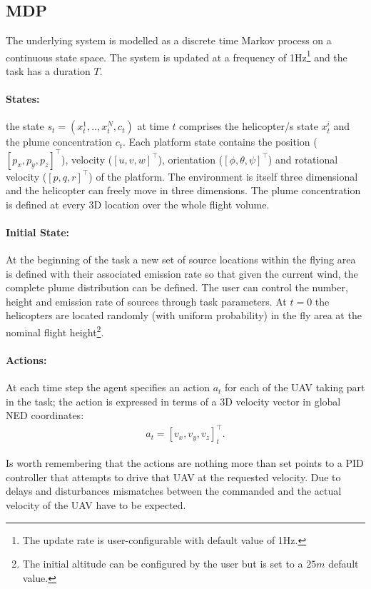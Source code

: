 \documentclass[a4paper,11pt]{report}
\begin{document}
\subsection{MDP}
The underlying system is modelled as a discrete time Markov process on a continuous state space. The system is updated at a frequency of 1Hz\footnote{The update rate is user-configurable with default value of 1Hz.} and the task has a duration $T$.

\paragraph{States:} the state $s_t=(x^1_t,..,x^N_t,c_t)$ at time $t$ comprises the helicopter/s state $x^i_t$ and the plume concentration $c_t$.
Each platform state contains the position ($[p_x,p_y,p_z]^\intercal$), velocity ($[u,v,w]^\intercal$), orientation ($[\phi,\theta,\psi]^\intercal$) and rotational velocity ($[p,q,r]^\intercal$) of the platform. The environment is itself three dimensional and the helicopter can freely move in three dimensions. The plume concentration is defined at every 3D location over the whole flight volume.

\paragraph{Initial State:} At the beginning of the task a new set of source locations within the flying area is defined with their associated emission rate so that given the current wind, the complete plume distribution can be defined. The user can control the number, height and emission rate of sources through task parameters.
At $t=0$ the helicopters are located randomly (with uniform probability) in the fly area at the nominal flight height\footnote{The initial altitude can be configured by the user but is set to a $25m$ default value.}.

\paragraph{Actions:}
At each time step the agent specifies an action $a_t$ for each of the UAV taking part in the task; the action is expressed in terms of a 3D velocity vector in global NED coordinates:
\begin{align}
a_t=[v_x,v_y,v_z]_t^\intercal.
\end{align}

Is worth remembering that the actions are nothing more than set points to a PID controller that attempts to drive that UAV at the requested velocity.
Due to delays and disturbances mismatches between the commanded and the actual velocity of the UAV have to be expected. 
\end{document}
